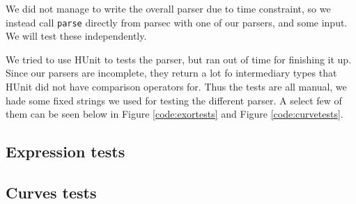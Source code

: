We did not manage to write the overall parser due to time constraint, so we
instead call \texttt{parse} directly from parsec with one of our parsers, and
some input. We will test these independently.

We tried to use HUnit to tests the parser, but ran out of time for finishing it
up. Since our parsers are incomplete, they return a lot fo intermediary types
that HUnit did not have comparison operators for. Thus the tests are all manual,
we hade some fixed strings we used for testing the different parser. A select
few of them can be seen below in Figure \ref{code:exortests} and Figure
\ref{code:curvetests}.

\subsection{Expression tests}



\subsection{Curves tests}


